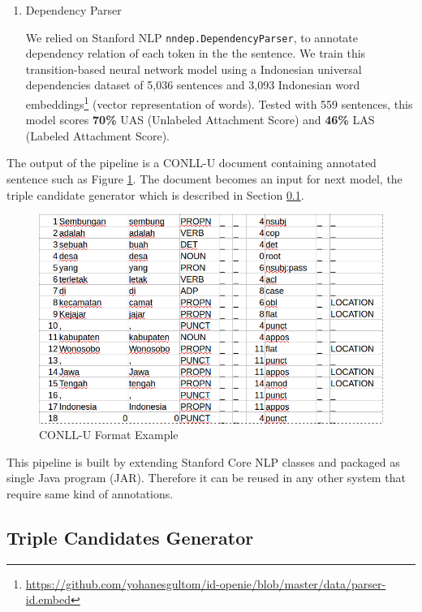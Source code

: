 \documentclass[peerreview,12pt]{IEEEtran}
\begin{document}
\begin{enumerate}
\item Dependency Parser

We relied on Stanford NLP \verb|nndep.DependencyParser|\cite{chen2014fast}, to annotate dependency relation of each token in the the sentence. We train this transition-based neural network model using a Indonesian universal dependencies dataset of 5,036 sentences and 3,093 Indonesian word embeddings\footnote{\url{https://github.com/yohanesgultom/id-openie/blob/master/data/parser-id.embed}} (vector representation of words). Tested with 559 sentences, this model scores \textbf{70\%} UAS (Unlabeled Attachment Score) and \textbf{46\%} LAS (Labeled Attachment Score).

\end{enumerate}

The output of the pipeline is a CONLL-U document containing annotated sentence such as Figure \ref{fig_conllu_example}. The document becomes an input for next model, the triple candidate generator which is described in Section \ref{Triple Candidates Generator}.

\begin{figure}
\centering
\includegraphics[scale=0.35]{conllu_example}
\caption{CONLL-U Format Example}
\label{fig_conllu_example}
\end{figure}

This pipeline is built by extending Stanford Core NLP classes and packaged as single Java program (JAR). Therefore it can be reused in any other system that require same kind of annotations.

\subsection{Triple Candidates Generator} \label{Triple Candidates Generator}
\end{document}
